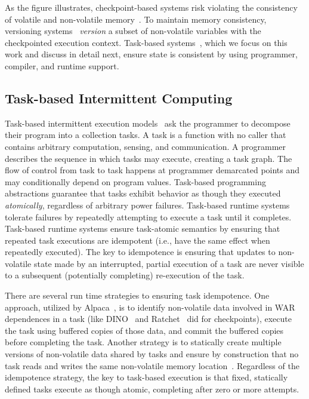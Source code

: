 As the figure illustrates, checkpoint-based systems risk violating the consistency of volatile and non-volatile memory~\cite{dino}. To maintain memory consistency, versioning systems~\cite{dino,ratchet} {\em version} a subset of non-volatile variables with the checkpointed execution context. Task-based systems~\cite{chain,alpaca}, which we focus on this work and discuss in detail next, ensure state is consistent by using programmer, compiler, and runtime support.

\subsection{Task-based Intermittent Computing}
\label{section:background_task_computing}

Task-based intermittent execution models~\cite{dino,chain,alpaca} ask the programmer to decompose their program into a collection tasks. A task is a function with no caller that contains arbitrary computation, sensing, and communication. A programmer describes the sequence in which tasks may execute, creating a task graph. The flow of control from task to task happens at programmer demarcated points and may conditionally depend on program values. Task-based programming abstractions guarantee that tasks exhibit behavior as though they executed {\em atomically}, regardless of arbitrary power failures. Task-based runtime systems tolerate failures by repeatedly attempting to execute a task until it completes. Task-based runtime systems ensure task-atomic semantics by ensuring that repeated task executions are idempotent (i.e., have the same effect when repeatedly executed). The key to idempotence is ensuring that updates to non-volatile state made by an interrupted, partial execution of a task are never visible to a subsequent (potentially completing)
re-execution of the task.  

There are several run time strategies to ensuring task idempotence. One approach, utilized by Alpaca~\cite{alpaca}, is to identify non-volatile data involved in WAR dependences in a task (like DINO~\cite{dino} and Ratchet~\cite{rachet} did for checkpoints), execute the task using buffered copies of those data, and commit the buffered copies before completing the task. Another strategy is to statically create multiple versions of non-volatile data shared by tasks and ensure by construction that no task reads and writes the same non-volatile memory location~\cite{chain}. Regardless of the idempotence strategy, the key to task-based execution is that fixed, statically defined tasks execute as though atomic, completing after zero or more attempts. 

